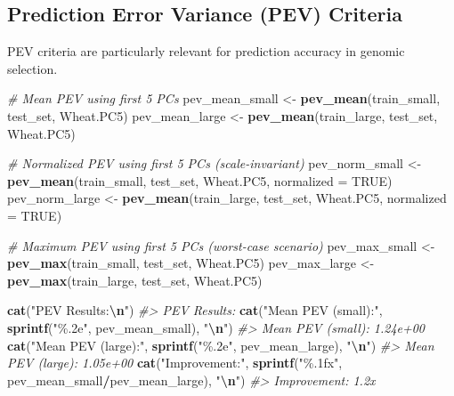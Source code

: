 \documentclass[
]{article}
\newenvironment{Shaded}{\begin{snugshade}}{\end{snugshade}}
\newcommand{\AttributeTok}[1]{\textcolor[rgb]{0.13,0.29,0.53}{#1}}
\newcommand{\CommentTok}[1]{\textcolor[rgb]{0.56,0.35,0.01}{\textit{#1}}}
\newcommand{\ConstantTok}[1]{\textcolor[rgb]{0.56,0.35,0.01}{#1}}
\newcommand{\FunctionTok}[1]{\textcolor[rgb]{0.13,0.29,0.53}{\textbf{#1}}}
\newcommand{\NormalTok}[1]{#1}
\newcommand{\OtherTok}[1]{\textcolor[rgb]{0.56,0.35,0.01}{#1}}
\newcommand{\SpecialCharTok}[1]{\textcolor[rgb]{0.81,0.36,0.00}{\textbf{#1}}}
\newcommand{\StringTok}[1]{\textcolor[rgb]{0.31,0.60,0.02}{#1}}
\begin{document}
\subsection{Prediction Error Variance (PEV)
Criteria}\label{prediction-error-variance-pev-criteria}

PEV criteria are particularly relevant for prediction accuracy in
genomic selection.

\begin{Shaded}
\begin{Highlighting}[]
\CommentTok{\# Mean PEV using first 5 PCs}
\NormalTok{pev\_mean\_small }\OtherTok{\textless{}{-}} \FunctionTok{pev\_mean}\NormalTok{(train\_small, test\_set, Wheat.PC5)}
\NormalTok{pev\_mean\_large }\OtherTok{\textless{}{-}} \FunctionTok{pev\_mean}\NormalTok{(train\_large, test\_set, Wheat.PC5)}

\CommentTok{\# Normalized PEV using first 5 PCs (scale{-}invariant)}
\NormalTok{pev\_norm\_small }\OtherTok{\textless{}{-}} \FunctionTok{pev\_mean}\NormalTok{(train\_small, test\_set, Wheat.PC5, }\AttributeTok{normalized =} \ConstantTok{TRUE}\NormalTok{)}
\NormalTok{pev\_norm\_large }\OtherTok{\textless{}{-}} \FunctionTok{pev\_mean}\NormalTok{(train\_large, test\_set, Wheat.PC5, }\AttributeTok{normalized =} \ConstantTok{TRUE}\NormalTok{)}

\CommentTok{\# Maximum PEV using first 5 PCs (worst{-}case scenario)}
\NormalTok{pev\_max\_small }\OtherTok{\textless{}{-}} \FunctionTok{pev\_max}\NormalTok{(train\_small, test\_set, Wheat.PC5)}
\NormalTok{pev\_max\_large }\OtherTok{\textless{}{-}} \FunctionTok{pev\_max}\NormalTok{(train\_large, test\_set, Wheat.PC5)}

\FunctionTok{cat}\NormalTok{(}\StringTok{"PEV Results:}\SpecialCharTok{\textbackslash{}n}\StringTok{"}\NormalTok{)}
\CommentTok{\#\textgreater{} PEV Results:}
\FunctionTok{cat}\NormalTok{(}\StringTok{"Mean PEV (small):"}\NormalTok{, }\FunctionTok{sprintf}\NormalTok{(}\StringTok{"\%.2e"}\NormalTok{, pev\_mean\_small), }\StringTok{"}\SpecialCharTok{\textbackslash{}n}\StringTok{"}\NormalTok{)}
\CommentTok{\#\textgreater{} Mean PEV (small): 1.24e+00}
\FunctionTok{cat}\NormalTok{(}\StringTok{"Mean PEV (large):"}\NormalTok{, }\FunctionTok{sprintf}\NormalTok{(}\StringTok{"\%.2e"}\NormalTok{, pev\_mean\_large), }\StringTok{"}\SpecialCharTok{\textbackslash{}n}\StringTok{"}\NormalTok{)}
\CommentTok{\#\textgreater{} Mean PEV (large): 1.05e+00}
\FunctionTok{cat}\NormalTok{(}\StringTok{"Improvement:"}\NormalTok{, }\FunctionTok{sprintf}\NormalTok{(}\StringTok{"\%.1fx"}\NormalTok{, pev\_mean\_small}\SpecialCharTok{/}\NormalTok{pev\_mean\_large), }\StringTok{"}\SpecialCharTok{\textbackslash{}n}\StringTok{"}\NormalTok{)}
\CommentTok{\#\textgreater{} Improvement: 1.2x}


\end{Highlighting}
\end{Shaded}
\end{document}
